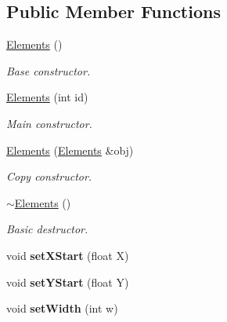\subsection*{Public Member Functions}
\begin{DoxyCompactItemize}
\item 
\hypertarget{class_elements_aaf76c70282b6997fc20f1d8c751d7146}{\hyperlink{class_elements_aaf76c70282b6997fc20f1d8c751d7146}{Elements} ()}\label{class_elements_aaf76c70282b6997fc20f1d8c751d7146}

\begin{DoxyCompactList}\small\item\em Base constructor. \end{DoxyCompactList}\item 
\hyperlink{class_elements_a15505a7088b59b169943cf0b3883d859}{Elements} (int id)
\begin{DoxyCompactList}\small\item\em Main constructor. \end{DoxyCompactList}\item 
\hyperlink{class_elements_a2a0658f7634191593c7d6eeab1556adc}{Elements} (\hyperlink{class_elements}{Elements} \&obj)
\begin{DoxyCompactList}\small\item\em Copy constructor. \end{DoxyCompactList}\item 
\hypertarget{class_elements_a28037b21a12317e69d6160da9f4844de}{\hyperlink{class_elements_a28037b21a12317e69d6160da9f4844de}{$\sim$\-Elements} ()}\label{class_elements_a28037b21a12317e69d6160da9f4844de}

\begin{DoxyCompactList}\small\item\em Basic destructor. \end{DoxyCompactList}\item 
\hypertarget{class_elements_a23add0eda070fb51f84eab6b94d5b886}{void {\bfseries set\-X\-Start} (float X)}\label{class_elements_a23add0eda070fb51f84eab6b94d5b886}

\item 
\hypertarget{class_elements_a2214c37dc1288a3763db6780bf7d6ee5}{void {\bfseries set\-Y\-Start} (float Y)}\label{class_elements_a2214c37dc1288a3763db6780bf7d6ee5}

\item 
\hypertarget{class_elements_a16f6accfe5a20c996dae8154132e4bf7}{void {\bfseries set\-Width} (int w)}\label{class_elements_a16f6accfe5a20c996dae8154132e4bf7}


\end{DoxyCompactItemize}
